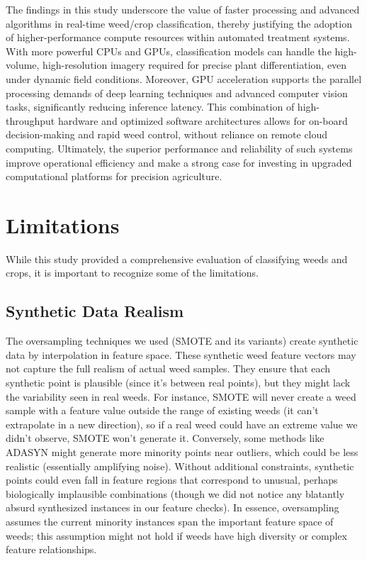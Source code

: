 \documentclass[letterpaper, notitlepage]{report}
\begin{document}
The findings in this study underscore the value of faster processing and advanced algorithms in real-time weed/crop classification, thereby justifying the adoption of higher-performance compute resources within automated treatment systems. With more powerful CPUs and GPUs, classification models can handle the high-volume, high-resolution imagery required for precise plant differentiation, even under dynamic field conditions. Moreover, GPU acceleration supports the parallel processing demands of deep learning techniques and advanced computer vision tasks, significantly reducing inference latency. This combination of high-throughput hardware and optimized software architectures allows for on-board decision-making and rapid weed control, without reliance on remote cloud computing. Ultimately, the superior performance and reliability of such systems improve operational efficiency and make a strong case for investing in upgraded computational platforms for precision agriculture.

\section{Limitations}
\label{section:limitations}
While this study provided a comprehensive evaluation of classifying weeds and crops, it is important to recognize some of the limitations.

\subsection{Synthetic Data Realism}
The oversampling techniques we used (SMOTE and its variants) create synthetic data by interpolation in feature space. These synthetic weed feature vectors may not capture the full realism of actual weed samples. They ensure that each synthetic point is plausible (since it’s between real points), but they might lack the variability seen in real weeds. For instance, SMOTE will never create a weed sample with a feature value outside the range of existing weeds (it can’t extrapolate in a new direction), so if a real weed could have an extreme value we didn’t observe, SMOTE won’t generate it. Conversely, some methods like ADASYN might generate more minority points near outliers, which could be less realistic (essentially amplifying noise). Without additional constraints, synthetic points could even fall in feature regions that correspond to unusual, perhaps biologically implausible combinations (though we did not notice any blatantly absurd synthesized instances in our feature checks). In essence, oversampling assumes the current minority instances span the important feature space of weeds; this assumption might not hold if weeds have high diversity or complex feature relationships.
\end{document}
